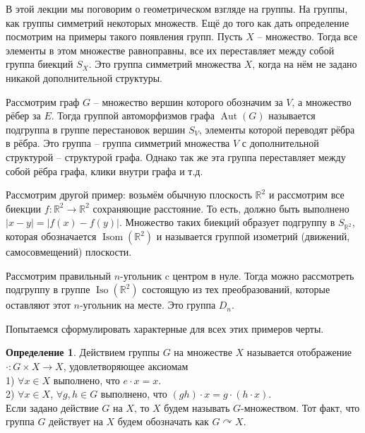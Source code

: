 \documentclass[10pt,a4paper,oneside]{book}
\theoremstyle{definition}
\newtheorem*{defn}{\color{yellow!30!red} Определение}
\newcommand{\mb}[1]{\mathbb{#1}}
\newcommand{\Aut}{\operatorname{Aut}}
\newcommand{\Iso}{\operatorname{Iso}}
\newcommand{\Isom}{\operatorname{Isom}}
\begin{document}
В этой лекции мы поговорим о геометрическом взгляде на группы. На группы, как группы симметрий некоторых множеств. Ещё до того как дать определение посмотрим на примеры такого появления групп. Пусть $X$ -- множество. Тогда все элементы в этом множестве равноправны, все их переставляет между собой группа биекций $S_X$. Это группа симметрий множества $X$, когда на нём не задано никакой дополнительной структуры. 

Рассмотрим граф $G$ -- множество вершин которого обозначим за $V$, а множество рёбер за $E$. Тогда группой автоморфизмов графа  $\Aut(G)$ называется подгруппа в группе перестановок вершин $S_V$, элементы которой переводят рёбра в рёбра. Это группа -- группа симметрий множества $V$ с дополнительной структурой -- структурой графа. Однако так же эта группа переставляет между собой рёбра графа, клики внутри графа и т.д.

Рассмотрим другой пример: возьмём обычную плоскость $\mb R^2$ и рассмотрим все биекции $f\colon \mb R^2 \to \mb R^2$ сохраняющие расстояние. То есть, должно быть выполнено $|x-y|=|f(x)-f(y)|$. Множество таких биекций образует подгруппу в $S_{\mb R^2}$, которая обозначается $\Isom(\mb R^2)$ и называется группой изометрий (движений, самосовмещений) плоскости. 

Рассмотрим правильный $n$-угольник c  центром в нуле. Тогда можно рассмотреть подгруппу в группе $\Iso (\mb R^2)$ состоящую из тех преобразований, которые оставляют этот $n$-угольник на месте. Это группа $D_n$.

Попытаемся сформулировать характерные для всех этих примеров черты.


\begin{defn}
Действием группы $G$ на множестве $X$ называется отображение $\cdot \colon G\times X\to X$, удовлетворяющее аксиомам\\
1) $\forall x \in X$  выполнено, что $e\cdot x=x$.\\
2) $\forall x \in X$, $\forall g,h\in G$ выполнено, что $(gh)\cdot x= g\cdot (h\cdot x)$.\\
Если задано действие $G$ на $X$, то $X$ будем называть $G$-множеством. Тот факт, что группа $G$ действует на $X$ будем обозначать как $G \curvearrowright X$. 
\end{defn}
\end{document}
